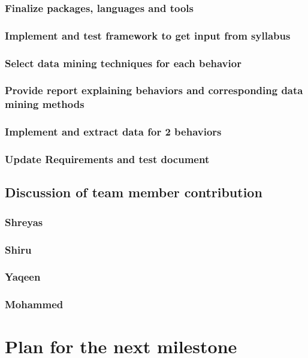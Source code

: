 \documentclass[12pt]{article}
\begin{document}
		\subsubsection{Finalize packages, languages and tools}
		\subsubsection{Implement and test framework to get input from syllabus}
		\subsubsection{Select data mining techniques for each behavior}
		\subsubsection{Provide report explaining behaviors and corresponding data mining methods}
		\subsubsection{Implement and extract data for 2 behaviors}
		\subsubsection{Update Requirements and test document}
		
	\subsection{Discussion of team member contribution}
	\subsubsection{Shreyas}
	\subsubsection{Shiru}
	\subsubsection{Yaqeen}
	\subsubsection{Mohammed}
	
	\section{Plan for the next milestone}
	\begin{tabularx}{\linewidth}{|X|X|X|X|X|}
	\end{tabularx}
\end{document}
